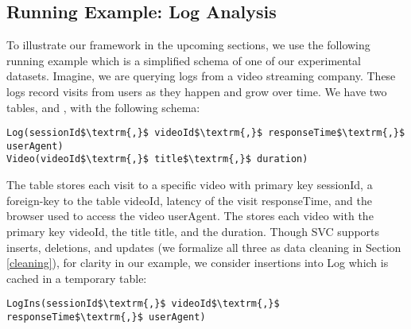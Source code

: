 \subsection{Running Example: Log Analysis}
To illustrate our framework in the upcoming sections, we use the following running example which is a 
simplified schema of one of our experimental datasets.
Imagine, we are querying logs from a video streaming company. 
These logs record visits from users as they happen and grow over time.
We have two tables,  and , with the following schema:
\begin{lstlisting}[mathescape,basicstyle={\scriptsize}]
Log(sessionId$\textrm{,}$ videoId$\textrm{,}$ responseTime$\textrm{,}$ userAgent)
Video(videoId$\textrm{,}$ title$\textrm{,}$ duration)
\end{lstlisting}
The  table stores each visit to a specific video with primary key \textsf{sessionId}, a foreign-key to the  table \textsf{videoId}, latency of the visit \textsf{responseTime}, and the browser used to access the video \textsf{userAgent}.
The  stores each video with the primary key \textsf{videoId}, the title \textsf{title}, and the \textsf{duration}.
Though SVC supports inserts, deletions, and updates (we formalize all three as data cleaning in Section \ref{cleaning}), for clarity in our example, we consider insertions
into Log which is cached in a temporary table:
\begin{lstlisting}[mathescape,basicstyle={\scriptsize}]
LogIns(sessionId$\textrm{,}$ videoId$\textrm{,}$ responseTime$\textrm{,}$ userAgent)
\end{lstlisting}




